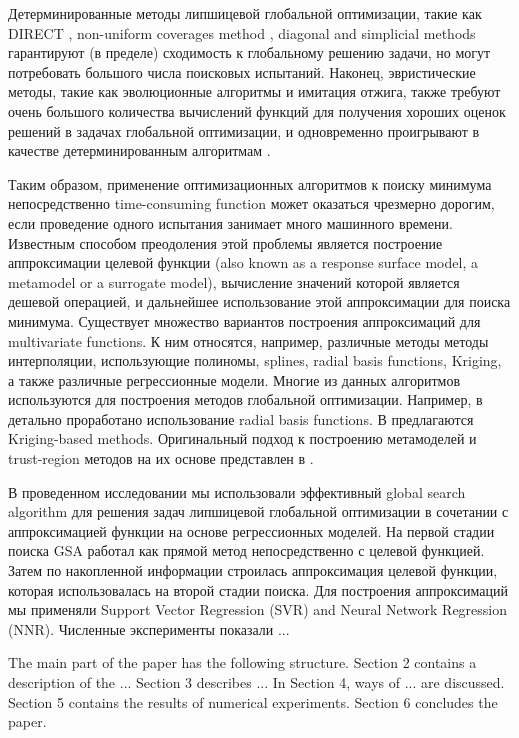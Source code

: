 \documentclass[sensors,article,submit,moreauthors,pdftex]{Definitions/mdpi}
\begin{document}
Детерминированные методы липшицевой глобальной оптимизации, такие как DIRECT \cite{Jones2009}, non-uniform coverages method \cite{Evtushenko2009,Evtushenko2013}, diagonal \cite{Sergeyev2017} and simplicial \cite{Zilinskas2014} methods гарантируют (в пределе) сходимость к глобальному решению задачи, но могут потребовать большого числа поисковых испытаний.
Наконец, эвристические методы, такие как эволюционные алгоритмы и имитация отжига, также требуют очень большого количества вычислений функций для получения хороших оценок решений в задачах глобальной оптимизации, и одновременно проигрывают в качестве  детерминированным алгоритмам \cite{Sergeyev2018,Kvasov2018}.

Таким образом, применение оптимизационных алгоритмов к поиску минимума непосредственно time-consuming function может оказаться чрезмерно дорогим, если проведение одного испытания занимает много машинного времени.
 Известным способом преодоления этой проблемы является построение аппроксимации целевой функции (also known as a response surface model, a metamodel or a surrogate model), вычисление значений которой является дешевой операцией, и дальнейшее использование этой аппроксимации для поиска минимума. 
Существует множество вариантов построения аппроксимаций для multivariate functions. К ним относятся, например, различные методы методы интерполяции, использующие полиномы, splines, radial basis functions, Kriging, а также различные регрессионные модели. Многие из данных алгоритмов используются для построения методов глобальной оптимизации. 
Например, в \cite{Gutmann2001,Regis2005} детально проработано использование radial basis functions. В \cite{Jones1998,UrRehman2014,Ollar2017_1} предлагаются Kriging-based methods. Оригинальный подход к построению метамоделей и trust-region методов на их основе представлен в \cite{Polynkin2012,Ollar2017_2,Toropov2018}. 

В проведенном исследовании мы использовали эффективный global search algorithm \cite{Strongin2000,Sergeyev2013} для решения задач липшицевой глобальной оптимизации в сочетании с аппроксимацией функции на основе регрессионных моделей. На первой стадии поиска GSA работал как прямой метод непосредственно с целевой функцией. Затем по накопленной информации строилась аппроксимация целевой функции, которая использовалась на второй стадии поиска.
Для построения аппроксимаций мы применяли Support Vector Regression (SVR) and Neural Network Regression (NNR). 
Численные эксперименты показали ...

The main part of the paper has the following structure. 
Section 2 contains a description of the ... 
Section 3 describes ... 
In Section 4, ways of ... are discussed. 
Section 5 contains the results of numerical experiments. 
Section 6 concludes the paper.
\end{document}
